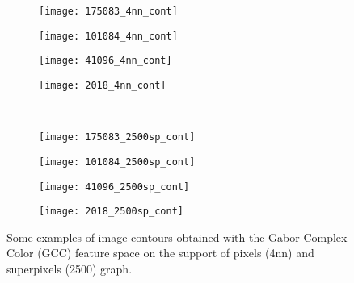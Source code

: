 \begin{figure}[!ht]
    \begin{subfigure}[t]{\textwidth+20pt\relax}
    	\centering
    	\texttt{[image: 175083\_4nn\_cont]} 
    \end{subfigure}      
    \begin{subfigure}[b]{0.23\textwidth}
    	\centering
        \texttt{[image: 101084\_4nn\_cont]}
    \end{subfigure}
    \begin{subfigure}[b]{0.23\textwidth}
    	\centering
        \texttt{[image: 41096\_4nn\_cont]}
    \end{subfigure}
    \begin{subfigure}[b]{0.23\textwidth}
    	\centering
        \texttt{[image: 2018\_4nn\_cont]}
    \end{subfigure} \\ \vspace{-5pt} 
    
    \begin{subfigure}[t]{\textwidth+20pt\relax}
    	\centering
    	\texttt{[image: 175083\_2500sp\_cont]} 
    \end{subfigure}      
    \begin{subfigure}[b]{0.23\textwidth}
    	\centering
        \texttt{[image: 101084\_2500sp\_cont]}
    \end{subfigure}
    \begin{subfigure}[b]{0.23\textwidth}
    	\centering
        \texttt{[image: 41096\_2500sp\_cont]}
    \end{subfigure}
    \begin{subfigure}[b]{0.23\textwidth}
    	\centering
        \texttt{[image: 2018\_2500sp\_cont]}
    \end{subfigure}   
    
	\caption{Some examples of image contours obtained with the Gabor Complex Color (GCC) feature space on the support of pixels (4nn) and superpixels (2500) graph.}\label{fig:GCC_results}    
\end{figure}


